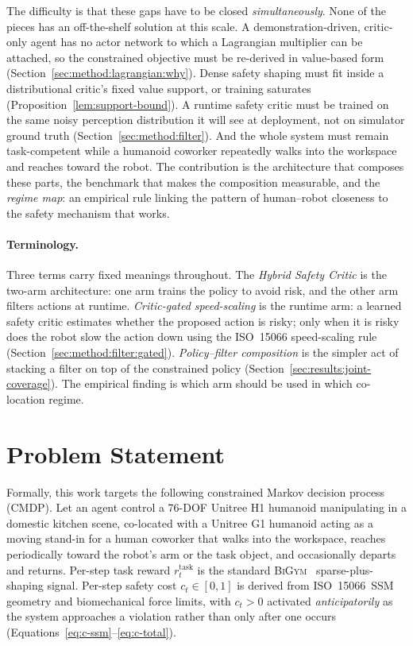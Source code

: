 \documentclass[11pt,a4paper]{report}
\newcommand{\ssm}{SSM}
\newcommand{\iso}{ISO~15066}
\newcommand{\bigym}{\textsc{BiGym}}
\begin{document}
The difficulty is that these gaps have to be closed
\emph{simultaneously}. None of the pieces has an off-the-shelf
solution at this scale. A demonstration-driven, critic-only agent has
no actor network to which a Lagrangian multiplier can be attached, so
the constrained objective must be re-derived in value-based form
(Section~\ref{sec:method:lagrangian:why}). Dense safety shaping must
fit inside a distributional critic's fixed value support, or training
saturates (Proposition~\ref{lem:support-bound}). A runtime safety
critic must be trained on the same noisy perception distribution it
will see at deployment, not on simulator ground truth
(Section~\ref{sec:method:filter}). And the whole system must remain
task-competent while a humanoid coworker repeatedly walks into the
workspace and reaches toward the robot. The contribution is the
architecture that composes these parts, the benchmark that makes the
composition measurable, and the \emph{regime map}: an empirical rule
linking the pattern of human--robot closeness to the safety mechanism
that works.

\paragraph{Terminology.}
Three terms carry fixed meanings throughout. The \emph{Hybrid Safety
Critic} is the two-arm architecture: one arm trains the policy to avoid
risk, and the other arm filters actions at runtime. \emph{Critic-gated
speed-scaling} is the runtime arm: a learned safety critic estimates
whether the proposed action is risky; only when it is risky does the
robot slow the action down using the \iso{} speed-scaling rule
(Section~\ref{sec:method:filter:gated}). \emph{Policy--filter
composition} is the simpler act of stacking a filter on top of the
constrained policy (Section~\ref{sec:results:joint-coverage}). The
empirical finding is which arm should be used in which co-location
regime.

\section{Problem Statement}
\label{sec:intro:problem}

Formally, this work targets the following constrained Markov
decision process (CMDP). Let an agent control a 76-DOF Unitree H1
humanoid manipulating in a domestic kitchen scene, co-located with a
Unitree G1 humanoid acting as a moving stand-in for a human coworker that walks
into the workspace, reaches periodically toward the robot's arm or the task object, and occasionally departs and
returns. Per-step task reward $r^{\mathrm{task}}_t$ is the standard
\bigym{}~\cite{chernyadev2024bigym} sparse-plus-shaping signal.
Per-step safety cost $c_t \in [0,1]$ is derived from \iso{}~\ssm{}
geometry and biomechanical force limits, with $c_t > 0$ activated
\emph{anticipatorily} as the system approaches a violation rather
than only after one occurs (Equations~\ref{eq:c-ssm}--\ref{eq:c-total}).
\end{document}
